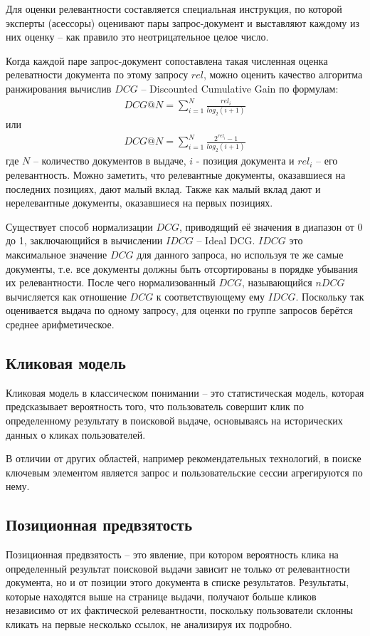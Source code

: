 \documentclass[diploma]{nanolab2015}
\begin{document}
Для оценки релевантности составляется специальная инструкция, по которой эксперты (асессоры) оценивают пары запрос-документ и выставляют каждому из них оценку -- как правило это неотрицательное целое число.

Когда каждой паре запрос-документ сопоставлена такая численная оценка релеватности документа по этому запросу $rel$, можно оценить качество алгоритма ранжирования вычислив $DCG$ -- Discounted Cumulative Gain по формулам:
\begin{align}
    DCG@N = \sum_{i=1}^{N} \frac{rel_i}{log_2(i+1)}
\end{align}
или
\begin{align}
    DCG@N = \sum_{i=1}^{N} \frac{2^{rel_i} - 1}{log_2(i+1)}
\end{align}
где $N$ -- количество документов в выдаче, $i$ - позиция документа и $rel_i$ -- его релевантность. Можно заметить, что релевантные документы, оказавшиеся на последних позициях, дают малый вклад. Также как малый вклад дают и нерелевантные документы, оказавшиеся на первых позициях.

Существует способ нормализации $DCG$, приводящий её значения в диапазон от 0 до 1, заключающийся в вычислении $IDCG$ -- Ideal DCG. $IDCG$ это максимальное значение $DCG$ для данного запроса, но используя те же самые документы, т.е. все документы должны быть отсортированы в порядке убывания их релевантности. После чего нормализованный $DCG$, называющийся $nDCG$ вычисляется как отношение $DCG$ к соответствующему ему $IDCG$. Поскольку так оценивается выдача по одному запросу, для оценки по группе запросов берётся среднее арифметическое.

\subsection{Кликовая модель}
Кликовая модель в классическом понимании -- это статистическая модель, которая предсказывает вероятность того, что пользователь совершит клик по определенному результату в поисковой выдаче, основываясь на исторических данных о кликах пользователей.

В отличии от других областей, например рекомендательных технологий, в поиске ключевым элементом является запрос и пользовательские сессии агрегируются по нему.

\subsection{Позиционная предвзятость}
Позиционная предвзятость -- это явление, при котором вероятность клика на определенный результат поисковой выдачи зависит не только от релевантности документа, но и от позиции этого документа в списке результатов. Результаты, которые находятся выше на странице выдачи, получают больше кликов независимо от их фактической релевантности, поскольку пользователи склонны кликать на первые несколько ссылок, не анализируя их подробно.
\end{document}
